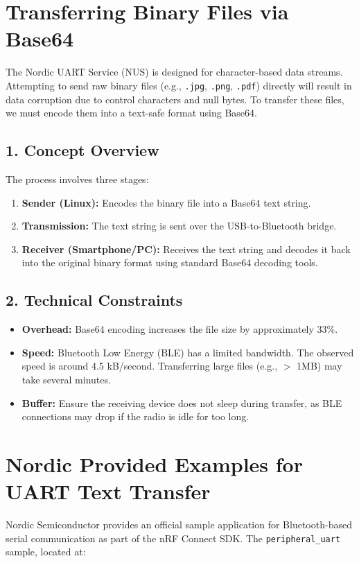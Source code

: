 \documentclass[conference]{IEEEtran}
\begin{document}
\section{Transferring Binary Files via Base64}
The Nordic UART Service (NUS) is designed for character-based data streams. Attempting to send raw binary files (e.g., \texttt{.jpg}, \texttt{.png}, \texttt{.pdf}) directly will result in data corruption due to control characters and null bytes. To transfer these files, we must encode them into a text-safe format using Base64. \\
\subsection{1. Concept Overview}
The process involves three stages:
\begin{enumerate}
    \item \textbf{Sender (Linux):} Encodes the binary file into a Base64 text string.
    \item \textbf{Transmission:} The text string is sent over the USB-to-Bluetooth bridge.
    \item \textbf{Receiver (Smartphone/PC):} Receives the text string and decodes it back into the original binary format using standard Base64 decoding tools.
\end{enumerate}

\subsection{2. Technical Constraints}
\begin{itemize}
    \item \textbf{Overhead:} Base64 encoding increases the file size by approximately 33\%.
    \item \textbf{Speed:} Bluetooth Low Energy (BLE) has a limited bandwidth. The observed speed is around 4.5 kB/second. Transferring large files (e.g., $>$ 1MB) may take several minutes.
    \item \textbf{Buffer:} Ensure the receiving device does not sleep during transfer, as BLE connections may drop if the radio is idle for too long.
\end{itemize}

\section{Nordic Provided Examples for UART Text Transfer}

Nordic Semiconductor provides an official sample application for Bluetooth-based 
serial communication as part of the nRF Connect SDK. The \texttt{peripheral\_uart} 
sample, located at:
\end{document}
